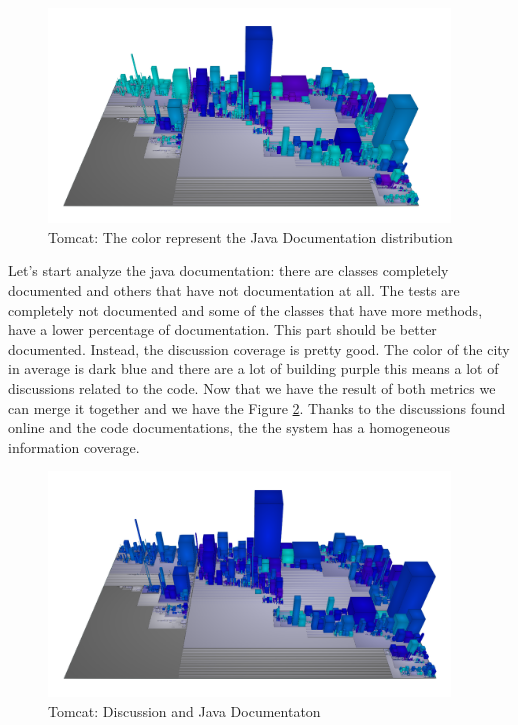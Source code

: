 \documentclass[]{usiinfbachelorproject}
\begin{document}
\begin{figure}[H]
	\centering
	\includegraphics[width=0.95\textwidth]{images/javadocTomcat}
	\caption[Tomcat: Java Documentation]{Tomcat: The color represent the Java Documentation distribution \label{fig:tomcatCorrollary:b}}
\end{figure}

Let's start analyze the java documentation: there are classes completely documented and others that have not documentation at all.
The tests are completely not documented and some of the classes that have more methods, have a lower percentage of documentation. This part should be better documented.
Instead, the discussion coverage is pretty good. The color of the city in average is dark blue and there are a lot of building purple this means a lot of discussions related to the code. 
Now that we have the result of both metrics we can merge it together and we have the Figure \ref{fig:tomcatCorrollary:c}. Thanks to the discussions found online and the code documentations, the the system has a homogeneous information coverage.
\begin{figure}[H]
	\centering
	\includegraphics[width=0.95\textwidth]{images/javaDocAndDiscussionTomcat}
	\caption[Tomcat: Discussion and Java Documentation]{Tomcat: Discussion and Java Documentaton \label{fig:tomcatCorrollary:c}}
\end{figure}
\end{document}
